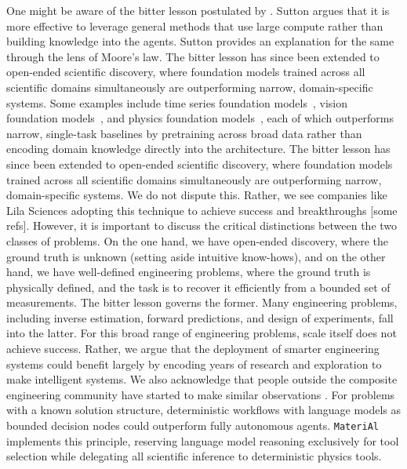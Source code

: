 \documentclass[preprint,review,10pt,number]{elsarticle}
\begin{document}
One might be aware of the bitter lesson postulated by \citet{sutton2019bitter}. 
Sutton argues that it is more effective to leverage general methods that use large compute rather than building knowledge into the agents.
Sutton provides an explanation for the same through the lens of Moore's law. 
The bitter lesson has since been extended to open-ended scientific discovery, where foundation models trained across all scientific domains simultaneously are outperforming narrow, domain-specific systems. 
Some examples include time series foundation models~\citep{ansari2024chronos}, vision foundation models~\citep{kirillov2023segment}, and physics foundation models~\citep{herde2024poseidon}, each of which outperforms narrow, single-task baselines by pretraining across broad data rather than encoding domain knowledge directly into the architecture.
The bitter lesson has since been extended to open-ended scientific discovery, where foundation models trained across all scientific domains simultaneously are outperforming narrow, domain-specific systems. 
We do not dispute this. 
Rather, we see companies like Lila Sciences adopting this technique to achieve success and breakthroughs [some refs].
However, it is important to discuss the critical distinctions between the two classes of problems.
On the one hand, we have open-ended discovery, where the ground truth is unknown (setting aside intuitive know-hows), and on the other hand, we have well-defined engineering problems, where the 
ground truth is physically defined, and the task is to recover it efficiently from a bounded set of measurements.
The bitter lesson governs the former.
Many engineering problems, including inverse estimation, forward predictions, and design of experiments, fall into the latter.
For this broad range of engineering problems, scale itself does not achieve success.
Rather, we argue that the deployment of smarter engineering systems could benefit largely by encoding years of research and exploration to make intelligent systems.
We also acknowledge that people outside the composite engineering community have started to make similar observations \cite{guo2026workflow}.
For problems with a known solution structure, deterministic workflows with language models as bounded decision nodes could outperform fully autonomous agents.
\texttt{MateriAl} implements this principle, reserving language model reasoning exclusively for tool selection while delegating all scientific inference to deterministic physics tools.
\end{document}
